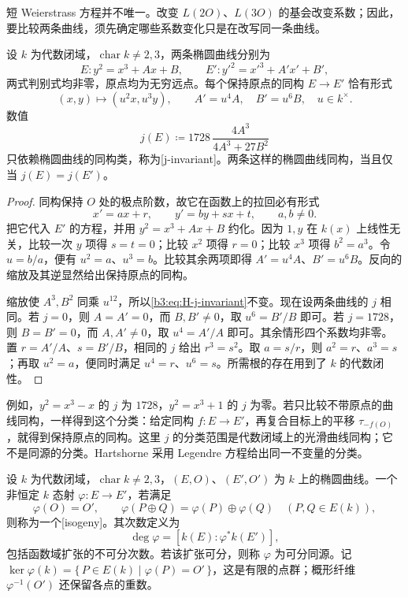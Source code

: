 短 Weierstrass 方程并不唯一。改变 \(L(2O)\)、\(L(3O)\) 的基会改变系数；因此，要比较两条曲线，须先确定哪些系数变化只是在改写同一条曲线。

\begin{proposition}\label{b3:prop:H-j-invariant}
	设 \(k\) 为代数闭域，\(\operatorname{char}k\ne2,3\)，两条椭圆曲线分别为
	\[
		E:y^2=x^3+Ax+B,\qquad
		E':y'^2=x'^3+A'x'+B',
	\]
	两式判别式均非零，原点均为无穷远点。每个保持原点的同构 \(E\rightarrow E'\) 恰有形式
	\[
		(x,y)\longmapsto(u^2x,u^3y),\qquad
		A'=u^4A,\quad B'=u^6B,
		\quad u\in k^\times.
	\]
	数值
	\begin{equation}\label{b3:eq:H-j-invariant}
		j(E)\coloneqq1728\,\frac{4A^3}{4A^3+27B^2}
	\end{equation}
	只依赖椭圆曲线的同构类，称为[j-invariant]。两条这样的椭圆曲线同构，当且仅当 \(j(E)=j(E')\)。
\end{proposition}
\begin{proof}
	同构保持 \(O\) 处的极点阶数，故它在函数上的拉回必有形式
	\[
		x'=ax+r,\qquad y'=by+sx+t,\qquad a,b\ne0.
	\]
	把它代入 \(E'\) 的方程，并用 \(y^2=x^3+Ax+B\) 约化。因为 \(1,y\) 在 \(k(x)\) 上线性无关，比较一次 \(y\) 项得 \(s=t=0\)；比较 \(x^2\) 项得 \(r=0\)；比较 \(x^3\) 项得 \(b^2=a^3\)。令 \(u=b/a\)，便有 \(u^2=a\)、\(u^3=b\)。比较其余两项即得 \(A'=u^4A\)、\(B'=u^6B\)。反向的缩放及其逆显然给出保持原点的同构。

	缩放使 \(A^3,B^2\) 同乘 \(u^{12}\)，所以\eqref{b3:eq:H-j-invariant}不变。现在设两条曲线的 \(j\) 相同。若 \(j=0\)，则 \(A=A'=0\)，而 \(B,B'\ne0\)，取 \(u^6=B'/B\) 即可。若 \(j=1728\)，则 \(B=B'=0\)，而 \(A,A'\ne0\)，取 \(u^4=A'/A\) 即可。其余情形四个系数均非零。置 \(r=A'/A\)、\(s=B'/B\)，相同的 \(j\) 给出 \(r^3=s^2\)。取 \(a=s/r\)，则 \(a^2=r\)、\(a^3=s\)；再取 \(u^2=a\)，便同时满足 \(u^4=r\)、\(u^6=s\)。所需根的存在用到了 \(k\) 的代数闭性。
\end{proof}

例如，\(y^2=x^3-x\) 的 \(j\) 为 \(1728\)，\(y^2=x^3+1\) 的 \(j\) 为零。若只比较不带原点的曲线同构，一样得到这个分类：给定同构 \(f:E\rightarrow E'\)，再复合目标上的平移 \(\tau_{-f(O)}\)，就得到保持原点的同构。这里 \(j\) 的分类范围是代数闭域上的光滑曲线同构；它不是同源的分类。Hartshorne 采用 Legendre 方程给出同一不变量的分类\cite[Chapter IV, Theorem 4.1, pp. 317--320]{Hartshorne1977}。

\begin{definition}\label{b3:def:H-isogeny}
	设 \(k\) 为代数闭域，\(\operatorname{char}k\ne2,3\)，\((E,O)\)、\((E',O')\) 为 \(k\) 上的椭圆曲线。一个非恒定 \(k\) 态射 \(\varphi:E\rightarrow E'\)，若满足
	\[
		\varphi(O)=O',\qquad
		\varphi(P\oplus Q)=\varphi(P)\oplus\varphi(Q)
		\quad(P,Q\in E(k)),
	\]
	则称为一个[isogeny]。其次数定义为
	\[
		\deg\varphi=[k(E):\varphi^*k(E')],
	\]
	包括函数域扩张的不可分次数。若该扩张可分，则称 \(\varphi\) 为可分同源。记 \(\ker\varphi(k)=\{\,P\in E(k)\mid\varphi(P)=O'\,\}\)，这是有限的点群；概形纤维 \(\varphi^{-1}(O')\) 还保留各点的重数。
\end{definition}

